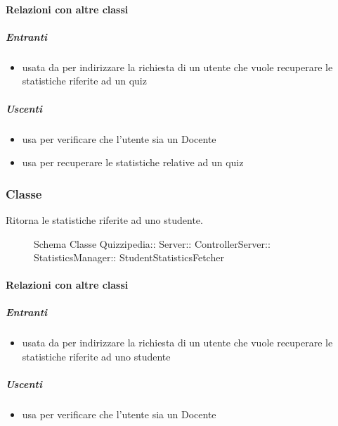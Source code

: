 \paragraph{Relazioni con altre classi}
\subparagraph{Entranti}
\begin{itemize}
\item usata da  per indirizzare la richiesta di un utente che vuole recuperare le statistiche riferite ad un quiz
\end{itemize}
\subparagraph{Uscenti}
\begin{itemize}
\item usa  per verificare che l'utente sia un Docente
\item usa  per recuperare le statistiche relative ad un quiz
\end{itemize}
\subsubsection{Classe }
Ritorna le statistiche riferite ad uno studente.
\begin{figure}[H]
\centering
\noindent{}
\caption[Schema Classe StudentStatisticsFetcher]{Schema Classe Quizzipedia:: Server:: ControllerServer:: StatisticsManager:: StudentStatisticsFetcher}
\end{figure}
\paragraph{Relazioni con altre classi}
\subparagraph{Entranti}
\begin{itemize}
\item usata da  per indirizzare la richiesta di un utente che vuole recuperare le statistiche riferite ad uno studente
\end{itemize}
\subparagraph{Uscenti}
\begin{itemize}
\item usa  per verificare che l'utente sia un Docente
\end{itemize}
